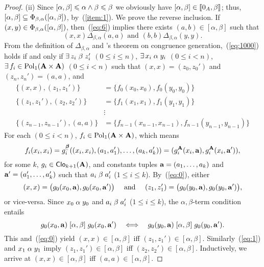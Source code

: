 \begin{proof}
\noindent (ii)
Since $[\alpha, \beta] \leqslant \alpha \wedge \beta\leqslant \beta$
we obviously have $[\alpha, \beta] \in \llbracket 0_A, \beta\rrbracket$; thus,
$[\alpha, \beta] \subseteq \Phi_{\beta, \alpha}([\alpha, \beta])$,
by~(\ref{item:1}).
    We prove the reverse inclusion.
    If $(x,y)\in \Phi_{\beta, \alpha}([\alpha, \beta])$, then~(\ref{eq:6})
    implies there exists $(a,b)\in [\alpha, \beta]$ such that
    \begin{equation}
      \label{eq:1000}
      (x,x) \mathrel{\Delta_{\beta, \alpha}} (a,a) \text{ and }
      (b,b) \mathrel{\Delta_{\beta, \alpha}} (y,y).
    \end{equation}
    From the definition of $\Delta_{\beta, \alpha}$ and 
    \malcev's theorem on congruence generation,~(\ref{eq:1000})
    holds if and only if
    $\exists \, z_i \mathrel{\beta} z_i'$ $(0\leq i \leq n)$,
    $\exists \, x_i \mathrel{\alpha} y_i$ $(0\leq i < n)$,
    $\exists\, f_i \in \operatorname{Pol}_1(\mathbf{A}\times \mathbf{A})$ $(0\leq i < n)$
    such that
    $(x, x) = (z_0,z_0')$ and
    $(z_n,z_n') = (a,a)$, and
    \begin{align}
      \label{eq:0}
      \{(x, x),(z_1,z_1')\} &= \{f_0(x_0,x_0), f_0(y_0,y_0)\}\\
      \label{eq:1}
      \{(z_1,z_1'),(z_2,z_2')\} &= \{f_1(x_1,x_1), f_1(y_1,y_1)\}\\
      \nonumber
      & \vdots\\
      \nonumber
      \{(z_{n-1},z_{n-1}'),(a, a)\} &= \{f_{n-1}(x_{n-1},x_{n-1}), f_{n-1}(y_{n-1},y_{n-1})\}
    \end{align}
    For each $(0\leq i < n)$, $f_i \in \operatorname{Pol}_1(\mathbf{A}\times \mathbf{A})$, which means
    \newcommand\gA{\ensuremath{g^{\bA}}}%
    \[      f_i(x_i, x_i) = g_i^{\bbeta}((x_i, x_i), (a_1, a_1'), \dots, (a_k, a_k') )
      = (g_i^{\bA}(x_i, \ba), g_i^{\bA}(x_i, \ba')),%
      \]%
    \renewcommand\gA{\ensuremath{g}}%
    for some $k$, $\gA_i \in \sansClo_{k+1}(\bA)$, and constants tuples
    $\mathbf{a} = (a_1, \dots, a_k)$ and $\mathbf{a}' = (a_1', \dots, a_k')$ such that
    $a_i \mathrel{\beta} a_i'$ ($1\leq i\leq k$). 
    By~(\ref{eq:0}), either
    \[
    (x, x) = \bigl(\gA_0(x_0, \ba), \gA_0(x_0, \ba')\bigr)
    \quad \text{ and } \quad 
    (z_1,z_1')= \bigl(\gA_0(y_0, \ba), \gA_0(y_0, \ba')\bigr),
    \]
    or vice-versa.  Since $x_0 \mathrel{\alpha} y_0$ and 
    $a_i \mathrel{\beta} a_i'$ ($1\leq i\leq k$), the $\alpha,\beta$-term condition
    entails
    \[
    \gA_0(x_0, \ba) \commr{\alpha}{\beta} \gA_0(x_0, \ba')
    \quad \Longleftrightarrow \quad 
    \gA_0(y_0, \ba) \commr{\alpha}{\beta} \gA_0(y_0, \ba').
    \]
    This and~(\ref{eq:0}) yield
    $(x,x)\in [\alpha, \beta]$ iff
    $(z_1,z_1')\in [\alpha, \beta]$.
    Similarly~(\ref{eq:1}) and $x_1 \mathrel{\alpha} y_1$ imply
    $(z_1,z_1')\in [\alpha, \beta]$ iff
    $(z_2,z_2')\in [\alpha, \beta]$.  Inductively, we arrive at 
    $(x,x)\in [\alpha, \beta]$ iff $(a,a)\in [\alpha, \beta]$.


\end{proof}
